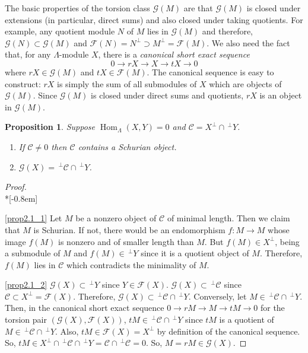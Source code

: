 \documentclass[10pt]{amsart}
\newtheorem{prop}[theo]{Proposition}
\theoremstyle{definition}
\DeclareMathOperator{\Hom}{Hom}%
\newcommand{\cC}{\ensuremath{{\mathcal{C}}}}
\newcommand{\cF}{\ensuremath{{\mathcal{F}}}}
\newcommand{\cG}{\ensuremath{{\mathcal{G}}}}
\begin{document}
The basic properties of the {torsion class} $\cG(M)$ are that $\cG(M)$ is closed under extensions (in particular, direct sums) and also closed under taking quotients. For example, any quotient module $N$ of $M$ lies in $\cG(M)$ and therefore, $\cG(N)\subset\cG(M)$ and $\cF(N)=N^\perp\supset M^\perp=\cF(M)$. We also need the fact that, for any $\Lambda$-module $X$, there is a \emph{canonical short exact sequence}
\[
	0\to rX\to X\to tX\to 0
\]
where $rX\in \cG(M)$ and $tX\in \cF(M)$. The canonical sequence is easy to construct: $rX$ is simply the sum of all submodules of $X$ which are objects of $\cG(M)$. Since $\cG(M)$ is closed under direct sums and quotients, $rX$ is an object in $\cG(M)$.




\begin{prop}\label{prop: HN stratification with 3 strata}
Suppose $\Hom_\Lambda(X,Y)=0$ and $\cC=X^\perp\cap\,^\perp Y$. 
\begin{enumerate}
\item\label{prop2.1_1} If $\cC\neq0$ then $\cC$ contains a Schurian object.
\item\label{prop2.1_2} $\cG(X)=\,^\perp \cC\cap\,^\perp Y$.
\end{enumerate}
\end{prop}

\begin{proof} \ \\*[-0.8em]

 \eqref{prop2.1_1} Let $M$ be a nonzero object of $\cC$ of minimal length. Then we claim that $M$ is Schurian. If not, there would be an endomorphism $f:M\to M$ whose image $f(M)$ is nonzero and of smaller length than $M$. But $f(M)\in X^\perp$, being a submodule of $M$ and $f(M)\in \,^\perp Y$ since it is a quotient object of $M$. Therefore, $f(M)$ lies in $\cC$ which contradicts the minimality of $M$.

\eqref{prop2.1_2} $\cG(X)\subset \,^\perp Y$ since $Y\in \cF(X)$. $\cG(X)\subset \,^\perp \cC$ since $\cC\subset  X^\perp=\cF(X)$. Therefore, $\cG(X)\subset \,^\perp\cC\cap \,^\perp Y$. Conversely, let $M\in \,^\perp \cC\cap\,^\perp Y$. Then, in the canonical short exact sequence $0\to rM\to M\to tM\to 0$ for the torsion pair $(\cG(X),\cF(X))$, $tM\in  \,^\perp \cC\cap\,^\perp Y$ since $tM$ is a quotient of $M\in \,^\perp \cC\cap\,^\perp Y$. Also, $tM\in \cF(X)= X^\perp$ by definition of the canonical sequence. So, $tM\in X^\perp\cap \,^\perp\cC\cap\,^\perp Y=\cC\cap \,^\perp \cC=0$. So, $M=rM\in\cG(X)$.
\end{proof}
\end{document}
